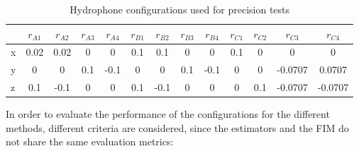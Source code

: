 \begin{table}[!htbp] %
	\begin{center}
		\begin{tabular}{ l | c c c c | c c c c | c c c c}
			\toprule
			\multicolumn{1}{c|}{} & $r_{A1}$ & $r_{A2}$ & $r_{A3}$ & $r_{A4}$ & $r_{B1}$ & $r_{B2}$ & $r_{B3}$ & $r_{B4}$ & $r_{C1}$ & $r_{C2}$ & $r_{C3}$ & $r_{C4}$ \\
			\midrule
			\multirow{1}{0.5em}{x} 
			& 0.02 & 0.02 & 0 & 0 & 0.1 & 0.1 & 0 & 0 & 0.1 & 0 & 0 & 0  \\
			\multirow{1}{0.5em}{y} 
			& 0 & 0 & 0.1 & -0.1 & 0 & 0 & 0.1 & -0.1 & 0 & 0 & -0.0707 & 0.0707 \\
			\multirow{1}{0.5em}{z} 
			& 0.1 & -0.1  & 0 & 0 & 0.1 & -0.1  & 0 & 0 & 0 & 0.1 & -0.0707  & -0.0707\\
			\bottomrule 
		\end{tabular}
		\caption{Hydrophone configurations used for precision tests}
		\label{tab:configs_test1}
	\end{center}
\end{table}

In order to evaluate the performance of the configurations for the different methods, different criteria are considered, since the estimators and the FIM do not share the same evaluation metrics:

